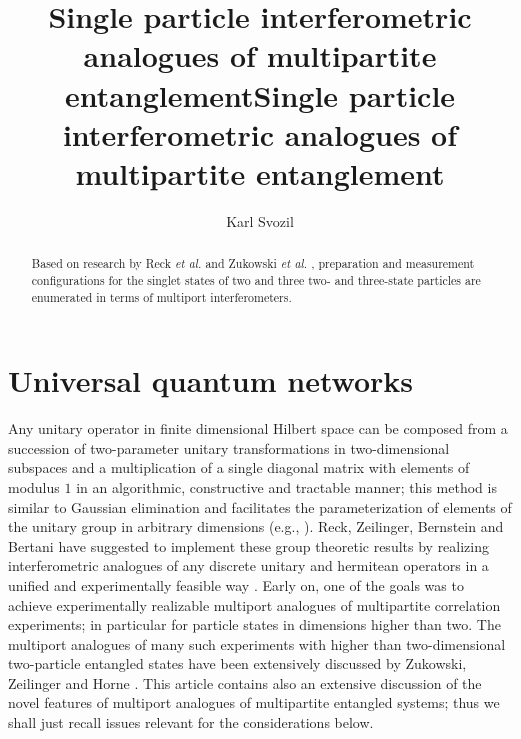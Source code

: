 \documentclass[pra,showpacs,showkeys,amsfonts]{revtex4}
\begin{document}
\title{\bf Single particle interferometric analogues of multipartite entanglement}


\coverpage

\title{Single particle interferometric analogues of multipartite entanglement}

\author{Karl Svozil}


\begin{abstract}
Based on research by Reck {\it et al.} \cite{rzbb} and Zukowski {\it et al.}
\cite{zukowski-97}, preparation and measurement configurations
for the singlet states of two and three two- and three-state particles
are enumerated in terms of multiport interferometers.
\end{abstract}






\maketitle

\section{Universal quantum networks}

Any unitary operator in finite dimensional Hilbert space
can be composed from a succession of two-parameter unitary transformations in
two-dimensional subspaces
and a multiplication of a single diagonal matrix with elements of modulus $1$
in an algorithmic, constructive and tractable manner;
this method is  similar to Gaussian elimination and facilitates the parameterization of elements
of the unitary group  in arbitrary dimensions (e.g., \cite[Chapter 2]{murnaghan}).
Reck, Zeilinger, Bernstein and Bertani have suggested to implement
these group theoretic results by realizing interferometric analogues
of any discrete unitary and hermitean operators
in a unified and experimentally feasible way \cite{rzbb,reck-94}.
Early on, one of the goals was to achieve experimentally realizable
multiport analogues of multipartite correlation experiments; in particular
for particle states in dimensions higher than two.
The multiport analogues of many such experiments with higher than two-dimensional
two-particle entangled states have been extensively discussed by
Zukowski, Zeilinger and Horne
\cite{zukowski-97}.
This article contains also an extensive discussion of the novel features
of multiport analogues of multipartite entangled systems; thus we shall
just recall issues relevant for the considerations below.
\end{document}
